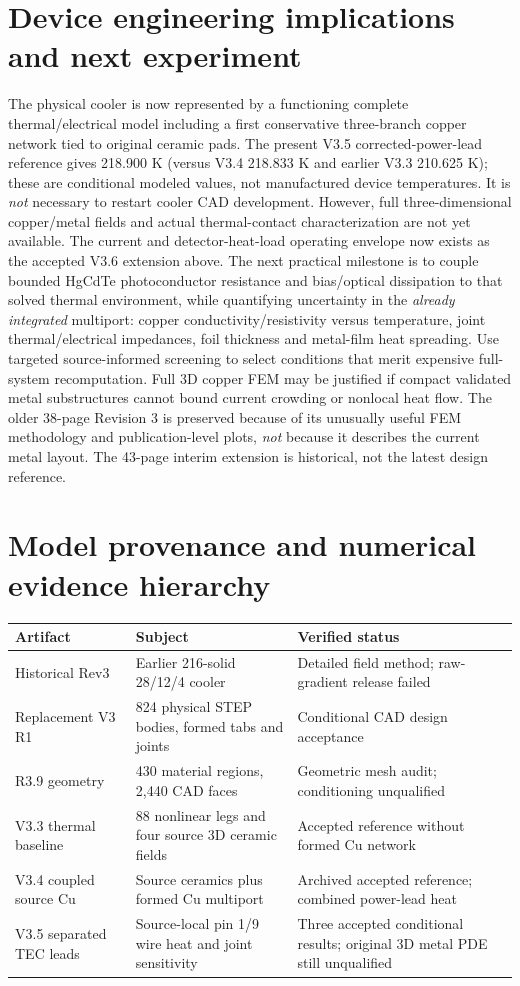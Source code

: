 \documentclass[10pt,a4paper]{article}
\begin{document}
\section{Device engineering implications and next experiment}
The physical cooler is now represented by a functioning complete thermal/electrical model including a first conservative three-branch copper network tied to original ceramic pads. The present V3.5 corrected-power-lead reference gives 218.900 K (versus V3.4 218.833 K and earlier V3.3 210.625 K); these are conditional modeled values, not manufactured device temperatures. It is \emph{not} necessary to restart cooler CAD development. However, full three-dimensional copper/metal fields and actual thermal-contact characterization are not yet available.
The current and detector-heat-load operating envelope now exists as the accepted V3.6 extension above. The next practical milestone is to couple bounded HgCdTe photoconductor resistance and bias/optical dissipation to that solved thermal environment, while quantifying uncertainty in the \emph{already integrated} multiport: copper conductivity/resistivity versus temperature, joint thermal/electrical impedances, foil thickness and metal-film heat spreading. Use targeted source-informed screening to select conditions that merit expensive full-system recomputation. Full 3D copper FEM may be justified if compact validated metal substructures cannot bound current crowding or nonlocal heat flow.
The older 38-page Revision 3 is preserved because of its unusually useful FEM methodology and publication-level plots, \emph{not} because it describes the current metal layout. The 43-page interim extension is historical, not the latest design reference.

\section{Model provenance and numerical evidence hierarchy}
\begin{tabularx}{\linewidth}{p{30mm}p{37mm}X}\toprule
Artifact & Subject & Verified status\\\midrule
Historical Rev3 & Earlier 216-solid 28/12/4 cooler & Detailed field method; raw-gradient release failed\\
Replacement V3 R1 & 824 physical STEP bodies, formed tabs and joints & Conditional CAD design acceptance\\
R3.9 geometry & 430 material regions, 2,440 CAD faces & Geometric mesh audit; conditioning unqualified\\
V3.3 thermal baseline & 88 nonlinear legs and four source 3D ceramic fields & Accepted reference without formed Cu network\\
V3.4 coupled source Cu & Source ceramics plus formed Cu multiport & Archived accepted reference; combined power-lead heat\\
V3.5 separated TEC leads & Source-local pin 1/9 wire heat and joint sensitivity & Three accepted conditional results; original 3D metal PDE still unqualified\\\bottomrule\end{tabularx}
\end{document}
